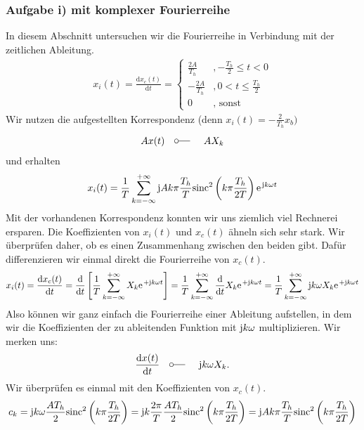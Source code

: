 \documentclass[11pt,a4paper,DIV=12]{scrartcl}
\newcommand{\diff}{\mathrm{d}}
\newcommand{\sinc}{\mathrm{sinc}}
\begin{document}
\subsubsection*{Aufgabe i) mit komplexer Fourierreihe}
%
%
In diesem Abschnitt untersuchen wir die Fourierreihe in Verbindung mit der
zeitlichen Ableitung.
%
%
\begin{align}
	x_{i}(t)=\frac{\diff x_{c}(t)}{\diff t}
	=
	\begin{cases}
		\frac{2A}{T_h}&,-\frac{T_h}{2}\leq t < 0\\
		-\frac{2A}{T_h}&,0<t\leq \frac{T_h}{2} \\
		0&,\text{ sonst}
	\end{cases}
\end{align}
%
%
Wir nutzen die aufgestellten Korrespondenz (denn $x_{i}(t)=-\frac{2}{T_h}x_{b})$
%
\begin{gather}
	Ax(t)\quad\fourier\quad AX_{k}
\end{gather}
%
und erhalten
%
\begin{align}
	x_{i}(t)=\frac{1}{T}\sum_{k=-\infty}^{+\infty}\im Ak\pi\frac{T_h}{T} \sinc^2\left(k\pi\frac{T_h}{2T}\right)\e^{\im k \omega t}
\end{align}
%
%
Mit der vorhandenen Korrespondenz konnten wir uns ziemlich viel Rechnerei
ersparen.
%
Die Koeffizienten von $x_{i}(t)$ und $x_{c}(t)$ ähneln sich sehr stark.
%
Wir überprüfen daher, ob es einen Zusammenhang zwischen den beiden gibt.
%
Dafür differenzieren wir einmal direkt die Fourierreihe von $x_{c}(t)$.
%
%
\begin{align}
	x_{i}(t)=\frac{\diff x_{c}(t)}{\diff t}
	=\frac{\diff }{\diff t}\left [\frac{1}{T}\sum_{k=-\infty}^{+\infty}X_k\e^{+\im k \omega t}\right ]
	=\frac{1}{T}\sum_{k=-\infty}^{+\infty}\frac{\diff }{\diff t}X_k\e^{+\im k \omega t}
	=\frac{1}{T}\sum_{k=-\infty}^{+\infty}\im k \omega X_k\e^{+\im k \omega t}
\end{align}
%
%
Also können wir ganz einfach die Fourierreihe einer Ableitung aufstellen,
in dem wir die Koeffizienten der zu ableitenden Funktion mit $\im k \omega$
multiplizieren.
%
Wir merken uns:
%
\begin{align}
	\frac{\diff x(t)}{\diff t}\quad\fourier\quad\im k \omega X_k.
\end{align}
%
Wir überprüfen es einmal mit den Koeffizienten von $x_c(t)$.
%
\begin{gather}
	c_k=\im k\omega \frac{AT_h}{2}\sinc^2\left(k\pi\frac{T_h}{2T}\right)
	=\im k\frac{2\pi}{T}\frac{AT_h}{2}\sinc^2\left(k\pi\frac{T_h}{2T}\right)
	=\im Ak\pi\frac{T_h}{T} \sinc^2\left(k\pi\frac{T_h}{2T}\right)
\end{gather}
\end{document}
